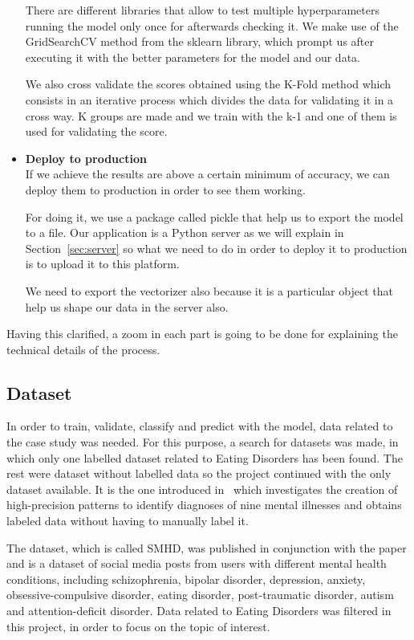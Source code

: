 \begin{itemize}
    There are different libraries that allow to test multiple hyperparameters running the model only once for afterwards checking it. We make use of the GridSearchCV method from the sklearn library, which prompt us after executing it with the better parameters for the model and our data.

    We also cross validate the scores obtained using the K-Fold method which consists in an iterative process which divides the data for validating it in a cross way. K groups are made and we train with the k-1 and one of them is used for validating the score.
    \item \textbf{Deploy to production}\\
    If we achieve the results are above a certain minimum of accuracy, we can deploy them to production in order to see them working. 

    For doing it, we use a package called pickle that help us to export the model to a file. Our application is a Python server as we will explain in Section~\ref{sec:server} so what we need to do in order to deploy it to production is to upload it to this platform.

    We need to export the vectorizer also because it is a particular object that help us shape our data in the server also.\\

\end{itemize}

Having this clarified, a zoom in each part is going to be done for explaining the technical details of the process.

\subsection{Dataset}
\label{sec:dataset}
In order to train, validate, classify and predict with the model, data related to the case study was needed. For this purpose, a search for datasets was made, in which only one labelled dataset related to Eating Disorders has been found. The rest were dataset without labelled data so the project continued with the only dataset available. It is the one introduced in~\cite{https://doi.org/10.48550/arxiv.1806.05258} which investigates the creation of high-precision patterns to identify diagnoses of nine mental illnesses and obtains labeled data without having to manually label it.

The dataset, which is called SMHD, was published in conjunction with the paper and is a dataset of social media posts from users with different mental health conditions, including schizophrenia, bipolar disorder, depression, anxiety, obsessive-compulsive disorder, eating disorder, post-traumatic disorder, autism and attention-deficit disorder. Data related to Eating Disorders was filtered in this project, in order to focus on the topic of interest.


